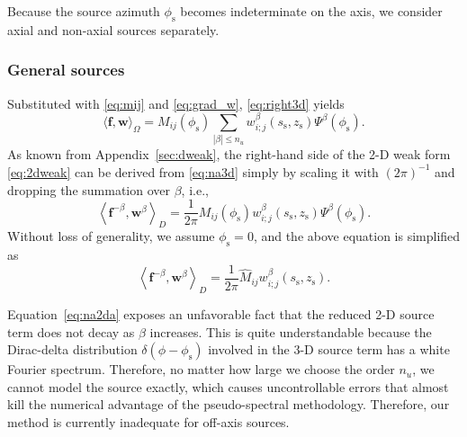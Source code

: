 \documentclass[extra]{gji}
\begin{document}
Because the source azimuth $\phi_\text{s}$ becomes indeterminate on the axis, 
we consider axial and non-axial sources separately. 

\subsubsection{General sources}  
\label{sec:offaxis}
Substituted with \eqref{eq:mij} and \eqref{eq:grad_w}, 
\eqref{eq:right3d} yields 
\begin{equation}
  \langle \mathbf{f},\mathbf{w}\rangle_{\Omega}=
  M_{ij}\left(\phi_\text{s}\right)
  \sum_{|\beta|\le n_u} w_{i;j}^\beta\left(s_\text{s},z_\text{s}\right) 
  \Psi^\beta\left(\phi_\text{s}\right).
  \label{eq:na3d}
\end{equation}
As known from Appendix~\ref{sec:dweak}, the right-hand side of the 2-D weak 
form \eqref{eq:2dweak} can be derived from \eqref{eq:na3d} simply by 
scaling it with $\left(2\pi\right)^{-1}$ and dropping the summation over $\beta$, i.e., 
\begin{equation}
  \left\langle \mathbf{f}^{-\beta},\mathbf{w}^\beta \right\rangle _{D}=
  \frac{1}{2\pi}
  M_{ij}\left(\phi_\text{s}\right)
  w_{i;j}^\beta\left(s_\text{s},z_\text{s}\right) \Psi^\beta\left(\phi_\text{s}\right).
  \label{eq:na2d} 
\end{equation}
Without loss of generality, we assume $\phi_\text{s}=0$, and the above 
equation is simplified as
\begin{equation}
  \left\langle \mathbf{f}^{-\beta},\mathbf{w}^\beta \right\rangle _{D}=
  \frac{1}{2\pi}
  \hat{M}_{ij} w_{i;j}^\beta\left(s_\text{s},z_\text{s}\right). 
  \label{eq:na2da} 
\end{equation}

Equation~\eqref{eq:na2da} exposes an unfavorable fact that 
the reduced 2-D source term does not decay as $\beta$ increases. 
This is quite understandable because
the Dirac-delta distribution $\delta\left(\phi-\phi_\text{s}\right)$ involved in 
the 3-D source term has a white Fourier spectrum.
Therefore, no matter how large we choose the order $n_u$, we cannot 
model the source exactly, which causes uncontrollable errors that 
almost kill the numerical advantage of the pseudo-spectral methodology. 
Therefore, our method is currently inadequate for off-axis sources.
\end{document}
